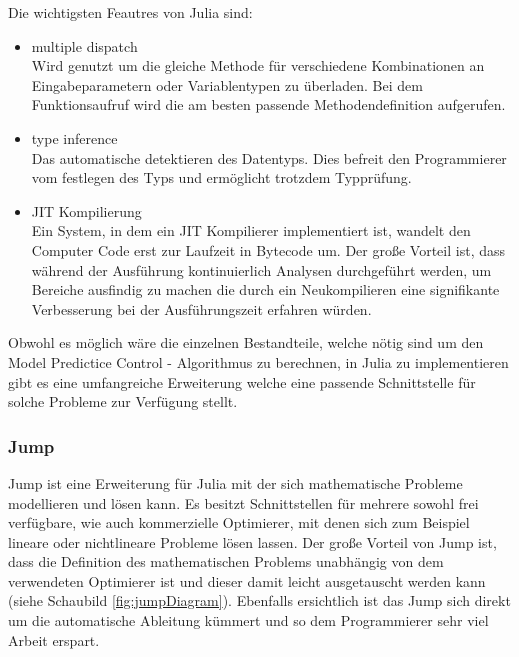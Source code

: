 \documentclass{like}
\begin{document}
Die wichtigsten Feautres von Julia sind:
\begin{itemize}

	\item multiple dispatch \\Wird genutzt um die gleiche Methode für verschiedene Kombinationen an Eingabeparametern oder Variablentypen zu überladen. Bei dem Funktionsaufruf wird die am besten passende Methodendefinition aufgerufen. \\
	\item type inference \\Das automatische detektieren des Datentyps. Dies befreit den Programmierer vom festlegen des Typs und ermöglicht trotzdem Typprüfung. \\
	\item \ac{JIT} Kompilierung\\ Ein System, in dem ein \ac{JIT} Kompilierer implementiert ist, wandelt den Computer Code erst zur Laufzeit in Bytecode um. Der große Vorteil ist, dass während der Ausführung kontinuierlich Analysen durchgeführt werden, um Bereiche ausfindig zu machen die durch ein Neukompilieren eine signifikante Verbesserung bei der Ausführungszeit erfahren würden. \\
\end{itemize}

Obwohl es möglich wäre die einzelnen Bestandteile, welche nötig sind um den Model Predictice Control - Algorithmus zu berechnen, in Julia zu implementieren gibt es eine umfangreiche Erweiterung welche eine passende Schnittstelle für solche Probleme zur Verfügung stellt.

\subsubsection*{Jump}
Jump ist eine Erweiterung für Julia mit der sich mathematische Probleme modellieren und lösen kann. Es besitzt Schnittstellen für mehrere sowohl frei verfügbare, wie auch kommerzielle Optimierer, mit denen sich zum Beispiel lineare oder nichtlineare Probleme lösen lassen. Der große Vorteil von Jump ist, dass die Definition des mathematischen Problems unabhängig von dem verwendeten Optimierer ist und dieser damit leicht ausgetauscht werden kann (siehe Schaubild \ref{fig:jumpDiagram}). Ebenfalls ersichtlich ist das Jump sich direkt um die automatische Ableitung kümmert und so dem Programmierer sehr viel Arbeit erspart. 
\end{document}
